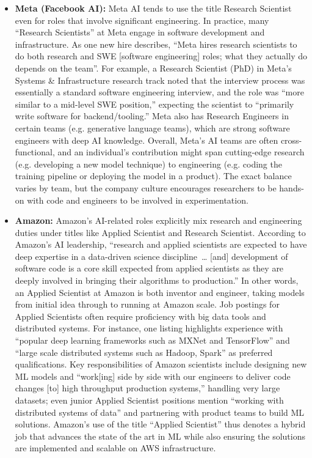 \documentclass[pdflatex,sn-mathphys-num]{sn-jnl}%
\theoremstyle{thmstyleone}%
\theoremstyle{thmstyletwo}%
\theoremstyle{thmstylethree}%
\begin{document}
\begin{itemize}
\item \textbf{Meta (Facebook AI):} Meta AI tends to use the title Research Scientist even for roles that involve significant engineering. In practice, many “Research Scientists” at Meta engage in software development and infrastructure. As one new hire describes, “Meta hires research scientists to do both research and SWE [software engineering] roles; what they actually do depends on the team”\cite{Lakshman2025-MetaRS}. For example, a Research Scientist (PhD) in Meta’s Systems \& Infrastructure research track noted that the interview process was essentially a standard software engineering interview, and the role was “more similar to a mid-level SWE position,” expecting the scientist to “primarily write software for backend/tooling.”\cite{Lakshman2025-MetaRS} Meta also has Research Engineers in certain teams (e.g. generative language teams), which are strong software engineers with deep AI knowledge\cite{MetaCareers-GenAI-2025}. Overall, Meta’s AI teams are often cross-functional, and an individual’s contribution might span cutting-edge research (e.g. developing a new model technique) to engineering (e.g. coding the training pipeline or deploying the model in a product). The exact balance varies by team, but the company culture encourages researchers to be hands-on with code and engineers to be involved in experimentation. 

\item \textbf{Amazon:} Amazon’s AI-related roles explicitly mix research and engineering duties under titles like Applied Scientist and Research Scientist. According to Amazon’s AI leadership, “research and applied scientists are expected to have deep expertise in a data-driven science discipline … [and] development of software code is a core skill expected from applied scientists as they are deeply involved in bringing their algorithms to production.”\cite{Zeng2022-AmazonCareer} In other words, an Applied Scientist at Amazon is both inventor and engineer, taking models from initial idea through to running at Amazon scale. Job postings for Applied Scientists often require proficiency with big data tools and distributed systems. For instance, one listing highlights experience with “popular deep learning frameworks such as MXNet and TensorFlow” and “large scale distributed systems such as Hadoop, Spark” as preferred qualifications\cite{AIJobs-Applied-Ads-2023}. Key responsibilities of Amazon scientists include designing new ML models and “work[ing] side by side with our engineers to deliver code changes [to] high throughput production systems,” handling very large datasets; even junior Applied Scientist positions mention “working with distributed systems of data” and partnering with product teams to build ML solutions\cite{AmazonAppliedSciJob}. Amazon’s use of the title “Applied Scientist” thus denotes a hybrid job that advances the state of the art in ML while also ensuring the solutions are implemented and scalable on AWS infrastructure. 


\end{itemize}
\end{document}

